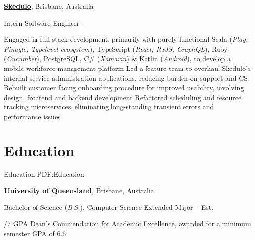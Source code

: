 \documentclass[a4paper,10pt,oneside]{article}
\begin{document}
\begin{minipage}[t][0pt]{\linewidth}
\begin{body}
\href{https://skedulo.com/}{\textbf{Skedulo}}, Brisbane, Australia
\par Intern Software Engineer\hfill {} --  
\begin{detail}
	\BulletItem Engaged in full-stack development, primarily with purely functional Scala (\textit{Play, Finagle, Typelevel ecosystem}),\newline
	TypeScript (\textit{React, RxJS, GraphQL}), Ruby (\textit{Cucumber}), PostgreSQL, C\# (\textit{Xamarin}) \& Kotlin (\textit{Android}), to develop a mobile workforce management platform 
	\BulletItem Led a feature team to overhaul Skedulo's internal service administration applications, reducing burden on support and CS
	\BulletItem Rebuilt customer facing onboarding procedure for improved usability, involving design, frontend and backend development
	\BulletItem Refactored scheduling and resource tracking microservices, eliminating long-standing transient errors and performance issues
\end{detail}


\section
{Education}
{Education}
{PDF:Education}

\href{https://www.uq.edu.au/}{\textbf{University of Queensland}}, Brisbane, Australia
\par Bachelor of Science (\textit{B.S.}), Computer Science Extended Major \hfill {} -- Est. 
\begin{detail}
/7 GPA
\BulletItem Dean's Commendation for Academic Excellence, awarded for a minimum semester GPA of 6.6 \hfill {}
\end{detail}




\end{body}
\end{minipage}
\end{document}
